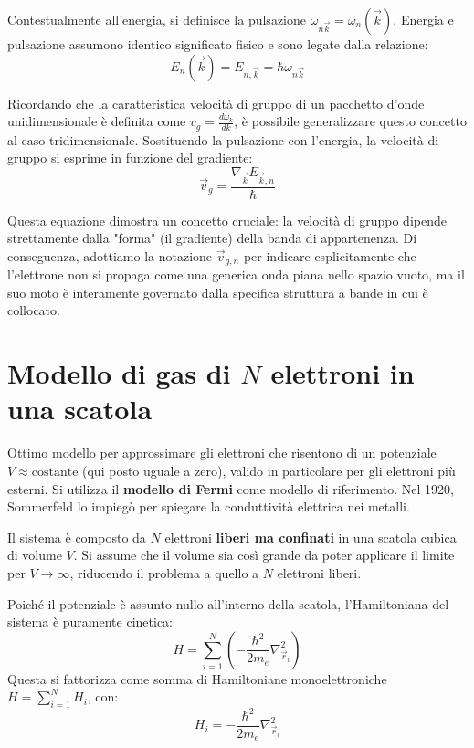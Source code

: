 Contestualmente all'energia, si definisce la pulsazione \(\omega_{n\vec{k}} = \omega_n(\vec{k})\). Energia e pulsazione assumono identico significato fisico e sono legate dalla relazione:
\begin{equation}
    E_n(\vec{k}) = E_{n,\vec{k}} = \hbar \omega_{n\vec{k}}
\end{equation}

Ricordando che la caratteristica velocità di gruppo di un pacchetto d'onde unidimensionale è definita come \(v_g = \frac{d\omega_k}{dk}\), è possibile generalizzare questo concetto al caso tridimensionale. Sostituendo la pulsazione con l'energia, la velocità di gruppo si esprime in funzione del gradiente:
\begin{equation}
    \vec{v}_g = \frac{\nabla_{\vec{k}} E_{\vec{k},n}}{\hbar}
\end{equation}

Questa equazione dimostra un concetto cruciale: la velocità di gruppo dipende strettamente dalla "forma" (il gradiente) della banda di appartenenza. Di conseguenza, adottiamo la notazione \( \vec{v}_{g,n}\) per indicare esplicitamente che l'elettrone non si propaga come una generica onda piana nello spazio vuoto, ma il suo moto è interamente governato dalla specifica struttura a bande in cui è collocato.

\section{Modello di gas di \texorpdfstring{\(N\)}{N} elettroni in una scatola}

Ottimo modello per approssimare gli elettroni che risentono di un potenziale \(V \approx \text{costante}\) (qui posto uguale a zero), valido in particolare per gli elettroni più esterni. Si utilizza il \textbf{modello di Fermi} come modello di riferimento. Nel 1920, Sommerfeld lo impiegò per spiegare la conduttività elettrica nei metalli.

Il sistema è composto da \(N\) elettroni \textbf{liberi ma confinati} in una scatola cubica di volume \(V\). Si assume che il volume sia così grande da poter applicare il limite per \(V \to \infty\), riducendo il problema a quello a \(N\) elettroni liberi.

Poiché il potenziale è assunto nullo all'interno della scatola, l'Hamiltoniana del sistema è puramente cinetica:
\begin{equation}
    H = \sum_{i=1}^{N} \left( -\frac{\hbar^2}{2m_e} \nabla^2_{\vec{r}_i} \right)
\end{equation}
Questa si fattorizza come somma di Hamiltoniane monoelettroniche \(H = \sum_{i=1}^{N} H_i\), con:
\begin{equation}
    H_i = -\frac{\hbar^2}{2m_e} \nabla^2_{\vec{r}_i}
\end{equation}

